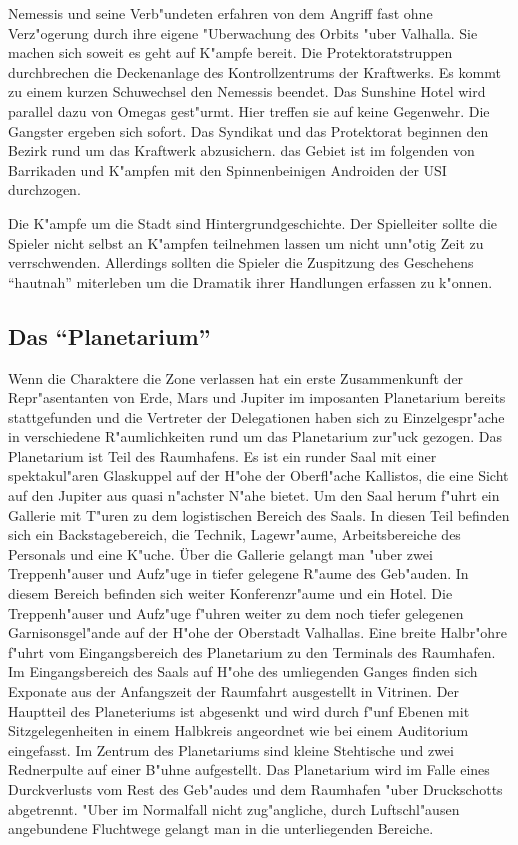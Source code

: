 Nemessis und seine Verb"undeten erfahren von dem Angriff fast ohne Verz"ogerung durch ihre eigene "Uberwachung des Orbits "uber Valhalla. Sie machen sich soweit es geht auf K"ampfe bereit. Die Protektoratstruppen durchbrechen die Deckenanlage des Kontrollzentrums der Kraftwerks. Es kommt zu einem kurzen Schu\3wechsel den Nemessis beendet. Das Sunshine Hotel wird parallel dazu von Omegas gest"urmt. Hier treffen sie auf keine Gegenwehr. Die Gangster ergeben sich sofort. Das Syndikat und das Protektorat beginnen den Bezirk rund um das Kraftwerk abzusichern. das Gebiet ist im folgenden von Barrikaden und K"ampfen mit den Spinnenbeinigen Androiden der USI durchzogen.

\begin{remarks}
	Die K"ampfe um die Stadt sind Hintergrundgeschichte. Der Spielleiter sollte die Spieler nicht selbst an K"ampfen teilnehmen lassen um nicht unn"otig Zeit zu verrschwenden. Allerdings sollten die Spieler die Zuspitzung des Geschehens "`hautnah"' miterleben um die Dramatik ihrer Handlungen erfassen zu k"onnen.
\end{remarks}


\subsection{Das "`Planetarium"'} 
Wenn die Charaktere die Zone verlassen hat ein erste Zusammenkunft der Repr"asentanten von Erde, Mars und Jupiter im imposanten Planetarium bereits stattgefunden und die Vertreter der Delegationen haben sich zu Einzelgespr"ache in verschiedene R"aumlichkeiten rund um das Planetarium zur"uck gezogen. Das Planetarium ist Teil des Raumhafens. Es ist ein runder Saal mit einer spektakul"aren Glaskuppel auf der H"ohe der Oberfl"ache Kallistos, die eine Sicht auf den Jupiter aus quasi n"achster N"ahe bietet. Um den Saal herum f"uhrt ein Gallerie mit T"uren zu dem logistischen Bereich des Saals. In diesen Teil befinden sich ein Backstagebereich, die Technik, Lagewr"aume, Arbeitsbereiche des Personals und eine K"uche. Über die Gallerie gelangt man "uber zwei Treppenh"auser und Aufz"uge in tiefer gelegene R"aume des Geb"auden. In diesem Bereich befinden sich weiter Konferenzr"aume und ein Hotel. Die Treppenh"auser und Aufz"uge f"uhren weiter zu dem noch tiefer gelegenen Garnisonsgel"ande auf der H"ohe der Oberstadt Valhallas. Eine breite Halbr"ohre f"uhrt vom Eingangsbereich des Planetarium zu den Terminals des Raumhafen. Im Eingangsbereich des Saals auf H"ohe des umliegenden Ganges finden sich Exponate aus der Anfangszeit der Raumfahrt ausgestellt in Vitrinen. Der Hauptteil des Planeteriums ist abgesenkt und wird durch f"unf Ebenen mit Sitzgelegenheiten in einem Halbkreis angeordnet wie bei einem Auditorium eingefasst. Im Zentrum des Planetariums sind kleine Stehtische und zwei Rednerpulte auf einer B"uhne aufgestellt. Das Planetarium wird im Falle eines Durckverlusts vom Rest des Geb"audes und dem Raumhafen "uber Druckschotts abgetrennt. "Uber im Normalfall nicht zug"angliche, durch Luftschl"ausen angebundene Fluchtwege gelangt man in die unterliegenden Bereiche.


